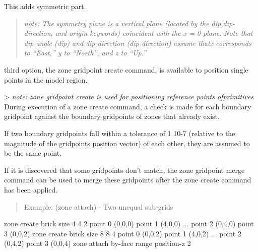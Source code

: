 \documentclass[a4paper, nobind]{templates/ociamthesis}
\newenvironment{Shaded}{\begin{snugshade}}{\end{snugshade}}
\newcommand{\BuiltInTok}[1]{#1}
\newcommand{\DecValTok}[1]{\textcolor[rgb]{0.00,0.00,0.81}{#1}}
\newcommand{\NormalTok}[1]{#1}
\newcommand{\OperatorTok}[1]{\textcolor[rgb]{0.81,0.36,0.00}{\textbf{#1}}}
\renewenvironment{Shaded}
{
  \vspace{10pt}%
  \begin{snugshade}%
}{%
  \end{snugshade}%
  \vspace{8pt}%
}
\begin{document}
This adds symmetric part.

\begin{quote}
\emph{note: The symmetry plane is a vertical plane (located by the dip,dip-direction, and origin keywords) coincident with the x = 0 plane.}
\emph{Note that dip angle (dip) and dip direction (dip-direction)}
\emph{assume thatx corresponds to ``East,'' y to ``North'', and z to ``Up.''}
\end{quote}

third option, the zone gridpoint create command, is available to
position single points in the model region.

\hfill\break
\textgreater{} \emph{note: zone gridpoint create is used for positioning reference points ofprimitives}\\

During execution of a zone create command, a check is made for each
boundary gridpoint against the boundary gridpoints of zones that already
exist.

\hfill\break
If two boundary gridpoints fall within a tolerance of 1 10-7 (relative to the magnitude of the gridpoints position vector) of each other, they are assumed to be the same point,

\hfill\break
If it is discovered that some gridpoints don't match, the zone gridpoint merge command can be used to merge these gridpoints after the zone create command has been applied.\\

\begin{quote}
Example: (zone attach) - Two unequal sub-grids
\end{quote}

\begin{Shaded}
\begin{Highlighting}[]
\NormalTok{zone create brick size }\DecValTok{4} \DecValTok{4} \DecValTok{2}\NormalTok{ point }\DecValTok{0}\NormalTok{ (}\DecValTok{0}\NormalTok{,}\DecValTok{0}\NormalTok{,}\DecValTok{0}\NormalTok{) point }\DecValTok{1}\NormalTok{ (}\DecValTok{4}\NormalTok{,}\DecValTok{0}\NormalTok{,}\DecValTok{0}\NormalTok{) ...}
\NormalTok{                             point }\DecValTok{2}\NormalTok{ (}\DecValTok{0}\NormalTok{,}\DecValTok{4}\NormalTok{,}\DecValTok{0}\NormalTok{) point }\DecValTok{3}\NormalTok{ (}\DecValTok{0}\NormalTok{,}\DecValTok{0}\NormalTok{,}\DecValTok{2}\NormalTok{)}
\NormalTok{zone create brick size }\DecValTok{8} \DecValTok{8} \DecValTok{4}\NormalTok{ point }\DecValTok{0}\NormalTok{ (}\DecValTok{0}\NormalTok{,}\DecValTok{0}\NormalTok{,}\DecValTok{2}\NormalTok{) point }\DecValTok{1}\NormalTok{ (}\DecValTok{4}\NormalTok{,}\DecValTok{0}\NormalTok{,}\DecValTok{2}\NormalTok{) ...}
\NormalTok{                             point }\DecValTok{2}\NormalTok{ (}\DecValTok{0}\NormalTok{,}\DecValTok{4}\NormalTok{,}\DecValTok{2}\NormalTok{) point }\DecValTok{3}\NormalTok{ (}\DecValTok{0}\NormalTok{,}\DecValTok{0}\NormalTok{,}\DecValTok{4}\NormalTok{)}
\NormalTok{zone attach by}\OperatorTok{{-}}\NormalTok{face }\BuiltInTok{range}\NormalTok{ position}\OperatorTok{{-}}\NormalTok{z }\DecValTok{2}
\end{Highlighting}
\end{Shaded}
\end{document}

